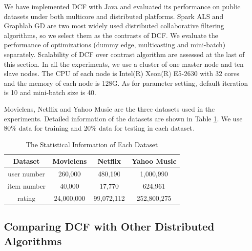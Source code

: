 \documentclass{llncs}
\begin{document}
We have implemented DCF with Java and evaluated its performance on public datasets under both multicore and distributed platforms. Spark ALS \cite{SparkMllib} and Graphlab \cite{graphlab} GD are two most widely used distributed collaborative filtering algorithms, so we select them as the contrasts of DCF. We evaluate the performance of optimizations (dummy edge, multicasting and mini-batch) separately. Scalability of DCF over contrast algorithm are assessed at the last of this section. In all the experiments, we use a cluster of one master node and ten slave nodes. The CPU of each node is Intel(R) Xeon(R) E5-2630 with 32 cores and the memory of each node is 128G. As for parameter setting, default iteration is 10 and mini-batch size is 40.

Movielens, Netflix and Yahoo Music are the three datasets used in the experiments. Detailed information of the datasets are shown in Table \ref{tab:dataset}. We use 80\% data for training and 20\% data for testing in each dataset.

\vspace{-10pt}
\begin{table}[!htb]
\renewcommand{\arraystretch}{1.3}
\caption{The Statistical Information of Each Dataset}
\vspace{-5pt}
\label{tab:dataset}
\centering
\begin{tabular}{|c|c|c|c|}
\hline
\textbf{Dataset} & Movielens & Netflix & Yahoo Music\\
\hline
user number & 260,000 & 480,190 & 1,000,990\\
\hline
item number & 40,000 & 17,770 & 624,961\\
\hline
rating & 24,000,000 & 99,072,112 & 252,800,275\\
\hline
\end{tabular}
\vspace{-5pt}
\end{table}

\subsection{Comparing DCF with Other Distributed Algorithms}
\vspace{-5pt}
\label{sub:dcf}
\end{document}
